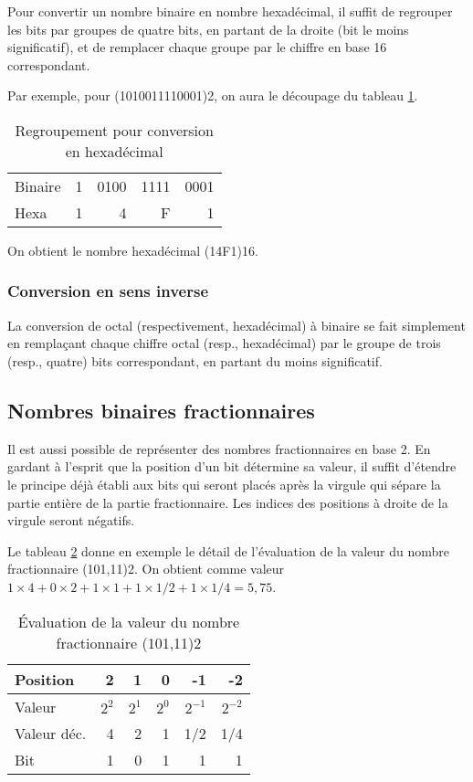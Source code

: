 \documentclass[11pt]{article}
\begin{document}
Pour convertir un nombre binaire en nombre hexadécimal, il suffit de
regrouper les bits par groupes de quatre bits, en partant de la droite
(bit le moins significatif), et de remplacer chaque groupe par le
chiffre en base 16 correspondant.

Par exemple, pour (1010011110001)2, on aura le découpage du tableau
\ref{tab:org696d429}.

\begin{table}[htbp]
\caption{\label{tab:org696d429}Regroupement pour conversion en hexadécimal}
\centering
\begin{tabular}{lrrrr}
 &  &  &  & \\[0pt]
\hline
Binaire & 1 & 0100 & 1111 & 0001\\[0pt]
Hexa & 1 & 4 & F & 1\\[0pt]
\end{tabular}
\end{table}

On obtient le nombre hexadécimal (14F1)16.

\subsubsection{Conversion en sens inverse}
\label{sec:org8c1e7ee}

La conversion de octal (respectivement, hexadécimal) à binaire se fait
simplement en remplaçant chaque chiffre octal (resp., hexadécimal) par
le groupe de trois (resp., quatre) bits correspondant, en partant du
moins significatif.

\subsection{Nombres binaires fractionnaires}
\label{sec:org201d9f3}

Il est aussi possible de représenter des nombres fractionnaires en
base 2. En gardant à l'esprit que la position d'un bit détermine sa
valeur, il suffit d'étendre le principe déjà établi aux bits qui
seront placés après la virgule qui sépare la partie entière de la
partie fractionnaire. Les indices des positions à droite de la virgule
seront négatifs.

Le tableau \ref{tab:org14e9153} donne en exemple le détail de l'évaluation
de la valeur du nombre fractionnaire (101,11)2. On obtient comme
valeur \(1 \times 4 + 0 \times 2 + 1 \times 1 + 1 \times 1/2 + 1
\times 1/4 = 5,75\).

\begin{table}[htbp]
\caption{\label{tab:org14e9153}Évaluation de la valeur du nombre fractionnaire (101,11)2}
\centering
\begin{tabular}{lrrrrr}
Position & 2 & 1 & 0 & -1 & -2\\[0pt]
\hline
Valeur & \(2^2\) & \(2^1\) & \(2^0\) & \(2^{-1}\) & \(2^{-2}\)\\[0pt]
Valeur déc. & 4 & 2 & 1 & 1/2 & 1/4\\[0pt]
Bit & 1 & 0 & 1 & 1 & 1\\[0pt]
\end{tabular}
\end{table}
\end{document}
